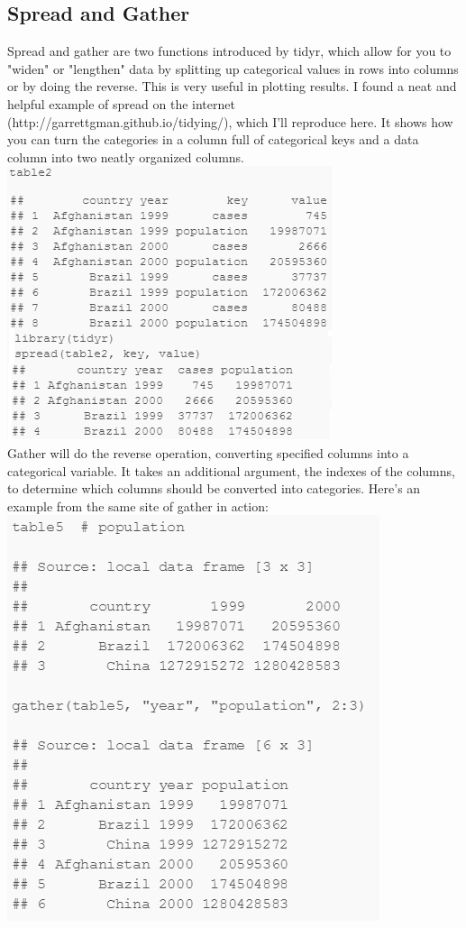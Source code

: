 \begin{itemize}
\subsection{Spread and Gather}
Spread and gather are two functions introduced by tidyr, which allow for you to "widen" or "lengthen" data by splitting up categorical values in rows into columns or by doing the reverse. This is very useful in plotting results. I found a neat and helpful example of spread on the internet (http://garrettgman.github.io/tidying/), which I'll reproduce here. It shows how you can turn the categories in a column full of categorical keys and a data column into two neatly organized columns.\\\includegraphics{spread}\\
Gather will do the reverse operation, converting specified columns into a categorical variable. It takes an additional argument, the indexes of the columns, to determine which columns should be converted into categories. Here's an example from the same site of gather in action: \\\includegraphics{gather}\\
\end{itemize}
